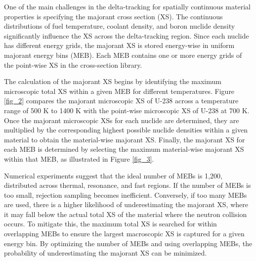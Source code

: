 One of the main challenges in the delta-tracking for spatially continuous material properties is specifying the majorant cross section (XS). The continuous distributions of fuel temperature, coolant density, and boron nuclide density significantly influence the XS across the delta-tracking region. Since each nuclide has different energy grids, the majorant XS is stored energy-wise in uniform majorant energy bins (MEB). Each MEB contains one or more energy grids of the point-wise XS in the cross-section library.

The calculation of the majorant XS begins by identifying the maximum microscopic total XS within a given MEB for different temperatures. Figure \ref{fig_2} compares the majorant microscopic XS of U-238 across a temperature range of 500 K to 1400 K with the point-wise microscopic XS of U-238 at 700 K. Once the majorant microscopic XSs for each nuclide are determined, they are multiplied by the corresponding highest possible nuclide densities within a given material to obtain the material-wise majorant XS. Finally, the majorant XS for each MEB is determined by selecting the maximum material-wise majorant XS within that MEB, as illustrated in Figure \ref{fig_3}.

Numerical experiments suggest that the ideal number of MEBs is 1,200, distributed across thermal, resonance, and fast regions. If the number of MEBs is too small, rejection sampling becomes inefficient. Conversely, if too many MEBs are used, there is a higher likelihood of underestimating the majorant XS, where it may fall below the actual total XS of the material where the neutron collision occurs. To mitigate this, the maximum total XS is searched for within overlapping MEBs to ensure the largest macroscopic XS is captured for a given energy bin. By optimizing the number of MEBs and using overlapping MEBs, the probability of underestimating the majorant XS can be minimized.

